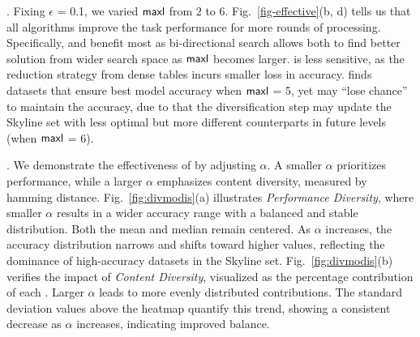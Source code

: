 .  Fixing $\epsilon$ = 0.1, we varied ${\mathsf{maxl}}$ from $2$ to $6$. Fig.~\ref{fig-effective}(b, d) tells us 
that all \modis algorithms improve the 
task performance
for more rounds of processing.  Specifically, \bimodis and \nomodis benefit most 
as bi-directional search allows both to find 
better solution from wider search space as ${\mathsf{maxl}}$ becomes larger. \apxmodis is less sensitive, 
as the reduction strategy from dense tables 
incurs smaller loss in accuracy.
\divmodis finds datasets that ensure 
best model accuracy when ${\mathsf{maxl}}$ = 5, yet may 
``lose chance'' to maintain the accuracy, due to 
that the diversification step may update 
the Skyline set with 
less optimal but more different counterparts in 
future levels (\eg when ${\mathsf{maxl}}$ = $6$).  



.
We demonstrate the effectiveness of \divmodis by adjusting $\alpha$.
A smaller $\alpha$ prioritizes performance, while a larger $\alpha$ emphasizes content diversity, measured by hamming distance.
Fig.~\ref{fig:divmodis}(a)  illustrates \textit{Performance Diversity}, where smaller 
$\alpha$ results in a wider accuracy range with a balanced and stable distribution. Both the mean and median remain centered. As $\alpha$ increases, the accuracy distribution narrows and shifts toward higher values, reflecting the dominance of high-accuracy datasets in the Skyline set.
Fig.~\ref{fig:divmodis}(b) verifies the impact of \textit{Content Diversity}, visualized as the percentage contribution of each \ad.  Larger 
$\alpha$ leads to more evenly distributed contributions. 
The standard deviation values above the heatmap quantify this trend, showing a consistent decrease as $\alpha$ increases, indicating improved balance.

